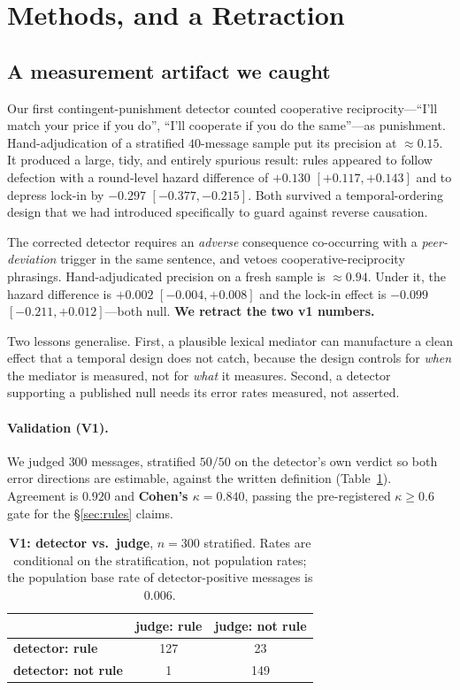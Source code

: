 \section{Methods, and a Retraction}
\label{sec:methods}

\subsection{A measurement artifact we caught}
\label{sec:retraction}

Our first contingent-punishment detector counted cooperative reciprocity---``I'll
match your price if you do'', ``I'll cooperate if you do the same''---as punishment.
Hand-adjudication of a stratified $40$-message sample put its precision at
$\approx\!0.15$. It produced a large, tidy, and entirely spurious result: rules
appeared to follow defection with a round-level hazard difference of
$+0.130$ $[+0.117,+0.143]$ and to depress lock-in by $-0.297$ $[-0.377,-0.215]$. Both
survived a temporal-ordering design that we had introduced specifically to guard
against reverse causation.

The corrected detector requires an \emph{adverse} consequence co-occurring with a
\emph{peer-deviation} trigger in the same sentence, and vetoes cooperative-reciprocity
phrasings. Hand-adjudicated precision on a fresh sample is $\approx\!0.94$. Under it,
the hazard difference is $+0.002$ $[-0.004,+0.008]$ and the lock-in effect is
$-0.099$ $[-0.211,+0.012]$---both null. \textbf{We retract the two v1 numbers.}

Two lessons generalise. First, a plausible lexical mediator can manufacture a clean
effect that a temporal design does not catch, because the design controls for
\emph{when} the mediator is measured, not for \emph{what} it measures. Second, a
detector supporting a published null needs its error rates measured, not asserted.

\paragraph{Validation (V1).}
We judged $300$ messages, stratified $50/50$ on the detector's own verdict so both
error directions are estimable, against the written definition
(Table~\ref{tab:v1}). Agreement is $0.920$ and \textbf{Cohen's
$\kappa=0.840$}, passing the pre-registered $\kappa\ge0.6$ gate for the
\S\ref{sec:rules} claims.

\begin{table}[h]
\centering
\caption{\textbf{V1: detector vs.\ judge}, $n{=}300$ stratified. Rates are conditional
on the stratification, not population rates; the population base rate of
detector-positive messages is $0.006$.}
\label{tab:v1}
\small
\begin{tabular}{lcc}
\toprule
& judge: rule & judge: not rule \\
\midrule
\textbf{detector: rule}     & 127 & 23 \\
\textbf{detector: not rule} & 1   & 149 \\
\bottomrule
\end{tabular}
\end{table}

